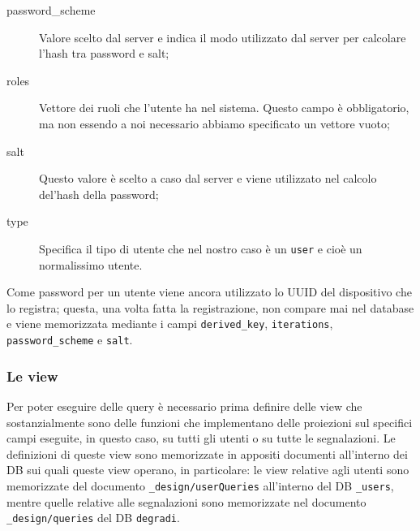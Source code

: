 \begin{description}
                    \item[password\_scheme] Valore scelto dal server e indica 
                    il modo utilizzato dal server per calcolare l'hash tra 
                    password e salt;
                    \item[roles] Vettore dei ruoli che l'utente ha nel 
                    sistema. Questo campo è obbligatorio, ma non essendo a noi
                    necessario abbiamo specificato un vettore vuoto;
                    \item[salt] Questo valore è scelto a caso dal server e 
                    viene utilizzato nel calcolo del'hash della password;
                    \item[type] Specifica il tipo di utente che nel nostro 
                    caso è un \texttt{user} e cioè un normalissimo utente. 
                \end{description}
                Come password per un utente viene ancora utilizzato lo UUID 
                del dispositivo che lo registra; questa, una volta fatta la 
                registrazione, non compare mai nel database e viene 
                memorizzata mediante i campi \texttt{derived\_key}, 
                \texttt{iterations}, \texttt{password\_scheme} e \texttt{salt}.
                
            \subsubsection{Le view}
                Per poter eseguire delle query è necessario prima definire 
                delle view che sostanzialmente sono delle funzioni che 
                implementano delle proiezioni sul specifici campi eseguite, in 
                questo caso, su tutti gli utenti o su tutte le segnalazioni.
                Le definizioni di queste view sono memorizzate in appositi 
                documenti all'interno dei DB sui quali queste view operano, in 
                particolare: le view relative agli utenti sono memorizzate del 
                documento \texttt{\_design/userQueries} all'interno del DB 
                \texttt{\_users}, mentre quelle relative alle segnalazioni 
                sono memorizzate nel documento \texttt{\_design/queries} del 
                DB \texttt{degradi}.

